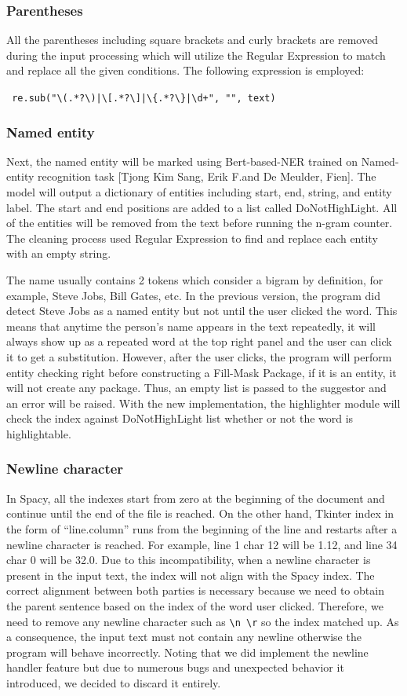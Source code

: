 \documentclass[12pt,oneside,openright,a4paper]{cpe-english-project}
\begin{document}
\subsubsection{Parentheses}
All the parentheses including square brackets and curly brackets are removed during the input processing which will utilize the Regular Expression to match and replace all the given conditions. The following expression is employed:

\verb/ re.sub("\(.*?\)|\[.*?\]|\{.*?\}|\d+", "", text)/

\subsubsection{Named entity}
Next, the named entity will be marked using Bert-based-NER trained on Named-entity recognition task [Tjong Kim Sang, Erik F.and De Meulder, Fien]. The model will output a dictionary of entities including start, end, string, and entity label. The start and end positions are added to a list called DoNotHighLight. All of the entities will be removed from the text before running the n-gram counter. The cleaning process used Regular Expression to find and replace each entity with an empty string.

The name usually contains 2 tokens which consider a bigram by definition, for example, Steve Jobs, Bill Gates, etc. In the previous version, the program did detect Steve Jobs as a named entity but not until the user clicked the word. This means that anytime the person's name appears in the text repeatedly, it will always show up as a repeated word at the top right panel and the user can click it to get a substitution. However, after the user clicks, the program will perform entity checking right before constructing a Fill-Mask Package, if it is an entity, it will not create any package. Thus, an empty list is passed to the suggestor and an error will be raised. With the new implementation, the highlighter module will check the index against DoNotHighLight list whether or not the word is highlightable.
\subsubsection{Newline character}
In Spacy, all the indexes start from zero at the beginning of the document and continue until the end of the file is reached. On the other hand, Tkinter index in the form of “line.column” runs from the beginning of the line and restarts after a newline character is reached. For example, line 1 char 12 will be 1.12, and line 34 char 0 will be 32.0. Due to this incompatibility, when a newline character is present in the input text, the index will not align with the Spacy index. The correct alignment between both parties is necessary because we need to obtain the parent sentence based on the index of the word user clicked. Therefore, we need to remove any newline character such as \verb/\n \r/ so the index matched up. As a consequence, the input text must not contain any newline otherwise the program will behave incorrectly.
Noting that we did implement the newline handler feature but due to numerous bugs and unexpected behavior it introduced, we decided to discard it entirely.
\end{document}

